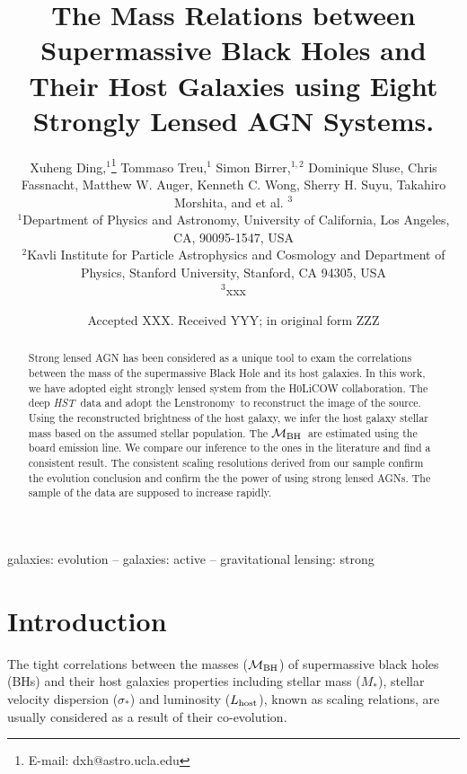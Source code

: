 \documentclass[fleqn,usenatbib]{mnras}
\title[Mass relations by lensed AGN hosts]{The Mass Relations between Supermassive Black Holes and Their Host Galaxies using Eight Strongly Lensed AGN Systems.}
\author[X. Ding et al.]{
Xuheng Ding,$^{1}$\thanks{E-mail: dxh@astro.ucla.edu}
Tommaso Treu,$^{1}$
Simon Birrer,$^{1, 2}$
Dominique Sluse,\newauthor
Chris Fassnacht,
Matthew W. Auger,
Kenneth C. Wong,
Sherry H. Suyu,\newauthor
Takahiro Morshita,
and et al. $^{3}$
\\
$^{1}$Department of Physics and Astronomy, University of California, Los Angeles, CA, 90095-1547, USA\\
$^{2}$Kavli Institute for Particle Astrophysics and Cosmology and Department of Physics, Stanford University, Stanford, CA 94305, USA\\
$^{3}$xxx
}
\date{Accepted XXX. Received YYY; in original form ZZZ}
\newcommand{\hst}{{\it HST}}
\newcommand{\mbh}{$\mathcal M_{\rm BH}$}
\newcommand{\lhost}{$L_{\rm host}$}
\newcommand{\lenstronomy}{{\sc Lenstronomy}}
\newcommand{\mstar}{{$M_*$}}
\begin{document}
\label{firstpage}
\pagerange{\pageref{firstpage}--\pageref{lastpage}}
\maketitle

\begin{abstract}
Strong lensed AGN has been considered as a unique tool to exam the correlations between the mass of the supermassive Black Hole and its host galaxies. In this work, we have adopted eight strongly lensed system from the H0LiCOW collaboration. The deep \hst\ data and adopt the \lenstronomy\ to reconstruct the image of the source. Using the reconstructed brightness of the host galaxy, we infer the host galaxy stellar mass based on the assumed stellar population. 
The \mbh\ are estimated using the board emission line. We compare our inference to the ones in the literature and find a consistent result. The consistent scaling resolutions derived from our sample confirm the evolution conclusion and confirm the the power of using strong lensed AGNs. The sample of the data are supposed to increase rapidly.
\end{abstract}

\begin{keywords}
galaxies: evolution -- galaxies: active -- gravitational lensing: strong
\end{keywords}



\section{Introduction}
The tight correlations between the masses (\mbh) of supermassive black holes (BHs) and their host galaxies properties including stellar mass (\mstar), stellar velocity dispersion ($\sigma_*$) and luminosity (\lhost), known as scaling relations, are usually considered as a result of their co-evolution.
\end{document}
